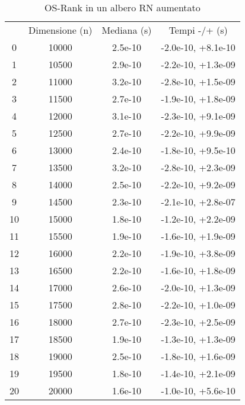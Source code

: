 \begin{table}
\centering
\caption{OS-Rank in un albero RN aumentato}
\label{OS-Rank in un albero RN aumentato}
\begin{adjustbox}{width=1\textwidth/2}
\begin{tabular}{|c|c|c|c|}
\hline
 & Dimensione (n) & Mediana (s) & Tempi -/+ (s) \\
0 & 10000 & 2.5e-10 & -2.0e-10, +8.1e-10 \\
\cline{1-4}
1 & 10500 & 2.9e-10 & -2.2e-10, +1.3e-09 \\
\cline{1-4}
2 & 11000 & 3.2e-10 & -2.8e-10, +1.5e-09 \\
\cline{1-4}
3 & 11500 & 2.7e-10 & -1.9e-10, +1.8e-09 \\
\cline{1-4}
4 & 12000 & 3.1e-10 & -2.3e-10, +9.1e-09 \\
\cline{1-4}
5 & 12500 & 2.7e-10 & -2.2e-10, +9.9e-09 \\
\cline{1-4}
6 & 13000 & 2.4e-10 & -1.8e-10, +9.5e-10 \\
\cline{1-4}
7 & 13500 & 3.2e-10 & -2.8e-10, +2.3e-09 \\
\cline{1-4}
8 & 14000 & 2.5e-10 & -2.2e-10, +9.2e-09 \\
\cline{1-4}
9 & 14500 & 2.3e-10 & -2.1e-10, +2.8e-07 \\
\cline{1-4}
10 & 15000 & 1.8e-10 & -1.2e-10, +2.2e-09 \\
\cline{1-4}
11 & 15500 & 1.9e-10 & -1.6e-10, +1.9e-09 \\
\cline{1-4}
12 & 16000 & 2.2e-10 & -1.9e-10, +3.8e-09 \\
\cline{1-4}
13 & 16500 & 2.2e-10 & -1.6e-10, +1.8e-09 \\
\cline{1-4}
14 & 17000 & 2.6e-10 & -2.0e-10, +1.3e-09 \\
\cline{1-4}
15 & 17500 & 2.8e-10 & -2.2e-10, +1.0e-09 \\
\cline{1-4}
16 & 18000 & 2.7e-10 & -2.3e-10, +2.5e-09 \\
\cline{1-4}
17 & 18500 & 1.9e-10 & -1.3e-10, +1.3e-09 \\
\cline{1-4}
18 & 19000 & 2.5e-10 & -1.8e-10, +1.6e-09 \\
\cline{1-4}
19 & 19500 & 1.8e-10 & -1.4e-10, +2.1e-09 \\
\cline{1-4}
20 & 20000 & 1.6e-10 & -1.0e-10, +5.6e-10 \\
\cline{1-4}
\end{tabular}
\end{adjustbox}
\end{table}
